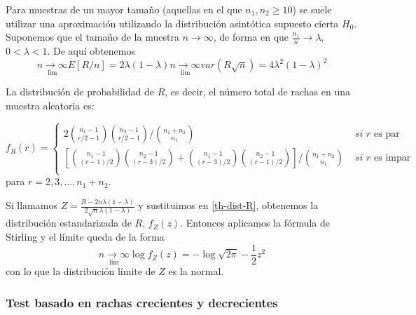 	Para muestras de un mayor tamaño (aquellas en el que $n_1, n_2 \geq 10$) se suele utilizar una aproximación utilizando la distribución asintótica supuesto cierta $H_0$.\\
	Suponemos que el tamaño de la muestra $n \rightarrow \infty$, de forma en que $\frac{n_1}{n} \rightarrow \lambda$, $0<\lambda<1$. De aquí obtenemos
	\[ \underset{\lim}{n \rightarrow \infty} E[R/n] = 
			2\lambda (1-\lambda) 
				\underset{\lim}{n \rightarrow \infty} 
					var(R\sqrt{n}) =
			4\lambda^2(1-\lambda)^2
	\]
	
\begin{teorema}
	La distribución de probabilidad de $R$, es decir, el número total de rachas en una muestra aleatoria es:
	
	\begin{equation}
		f_R(r) = \left\lbrace\begin{array}{ll}
	2 {n_1-1 \choose r/2-1} {n_2-1 \choose r/2-1} 
		\bigg/ {n_1 + n_2 \choose n_1} &
			\textit{ si } r \text{ es par} \\
	\left[
		{n_1-1 \choose (r-1)/2} {n_2-1 \choose (r-3)/2} +  
		{n_1-1 \choose (r-3)/2} {n_2-1 \choose (r-1)/2} 
	\right]
		\bigg/ {n_1 + n_2 \choose n_1} &
			\textit{ si } r \text{ es impar} \\		
		\end{array}\right.
	\label{th-dist-R}
	\end{equation}
	para $r=2, 3, \dots, n_1 + n_2.$
\end{teorema}
	
	Si llamamos $Z = \frac{R - 2n\lambda (1-\lambda)}{2 \sqrt{n}\lambda (1-\lambda)}$ y sustituimos en \ref{th-dist-R}, obtenemos la distribución estandarizada de $R$, $f_Z(z)$. Entonces aplicamos la fórmula de Stirling y el límite queda de la forma
	\[ \underset{\lim}{n \rightarrow \infty} \log f_Z(z)=
			-\log \sqrt{2\pi} - \frac{1}{2} z^2	\]
	con lo que la distribución límite de $Z$ es la normal. 
	
	
\subsubsection{Test basado en rachas crecientes y decrecientes}	

